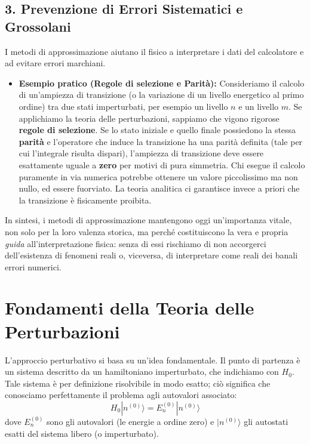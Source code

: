 \subsection{3. Prevenzione di Errori Sistematici e Grossolani}
I metodi di approssimazione aiutano il fisico a interpretare i dati del calcolatore e ad evitare errori marchiani.
\begin{itemize}
\item \textbf{Esempio pratico (Regole di selezione e Parità):} Consideriamo il calcolo di un'ampiezza di transizione (o la variazione di un livello energetico al primo ordine) tra due stati imperturbati, per esempio un livello $n$ e un livello $m$. Se applichiamo la teoria delle perturbazioni, sappiamo che vigono rigorose \textbf{regole di selezione}. Se lo stato iniziale e quello finale possiedono la stessa \textbf{parità} e l'operatore che induce la transizione ha una parità definita (tale per cui l'integrale risulta dispari), l'ampiezza di transizione deve essere esattamente uguale a \textbf{zero} per motivi di pura simmetria. Chi esegue il calcolo puramente in via numerica potrebbe ottenere un valore piccolissimo ma non nullo, ed essere fuorviato. La teoria analitica ci garantisce invece a priori che la transizione è fisicamente proibita.
\end{itemize}
In sintesi, i metodi di approssimazione mantengono oggi un'importanza vitale, non solo per la loro valenza storica, ma perché costituiscono la vera e propria \textit{guida} all'interpretazione fisica: senza di essi rischiamo di non accorgerci dell'esistenza di fenomeni reali o, viceversa, di interpretare come reali dei banali errori numerici.

\section{Fondamenti della Teoria delle Perturbazioni}

L'approccio perturbativo si basa su un'idea fondamentale. Il punto di partenza è un sistema descritto da un hamiltoniano imperturbato, che indichiamo con $H_0$. Tale sistema è per definizione risolvibile in modo esatto; ciò significa che conosciamo perfettamente il problema agli autovalori associato:
\begin{equation}
H_0 |n^{(0)}\rangle = E_n^{(0)} |n^{(0)}\rangle
\end{equation}
dove $E_n^{(0)}$ sono gli autovalori (le energie a ordine zero) e $\vert{}n^{(0)}\rangle$ gli autostati esatti del sistema libero (o imperturbato).

